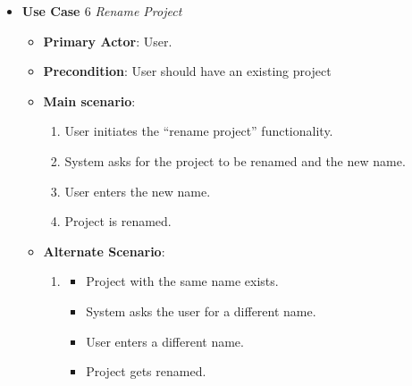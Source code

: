 \documentclass{report}
\begin{document}
\begin{tcolorbox}[colframe=white, colback=lightgreen, arc=8pt]
\begin{itemize}
    \item \textbf{Use Case $6$} \textit{Rename Project
}\\
    \begin{itemize}
        \item \textbf{Primary Actor}: User.
        \item \textbf{Precondition}: User should have an existing project
        \item \textbf{Main scenario}: \begin{enumerate}
            \item User initiates the “rename project” functionality. 
            \item System asks for the project to be renamed and the new name.
            \item User enters the new name.
            \item Project is renamed.
        \end{enumerate}
       \item \textbf{Alternate Scenario}: 
       \begin{enumerate}
           \item 
           \begin{itemize} 
           \item Project with the same name exists.
            \item System asks the user for a different name.
            \item User enters a different name.
            \item Project gets renamed.
           \end{itemize}
       \end{enumerate}
    \end{itemize}
\end{itemize}


\end{tcolorbox}
\end{document}
